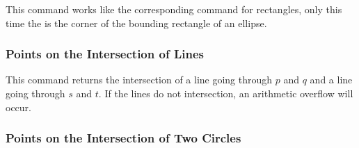 \begin{command}{\pgfpointborderellipse{}}
  This command works like the corresponding command for rectangles,
  only this time the  is the corner of the bounding
  rectangle of an ellipse.

\begin{codeexample}[]
\end{codeexample}
\end{command}


\subsubsection{Points on the Intersection of Lines}


\begin{command}{\pgfpointintersectionoflines{}}
  This command returns the intersection of a line going through $p$
  and $q$ and a line going through $s$ and $t$. If the lines do not
  intersection, an arithmetic overflow will occur.

\begin{codeexample}[]
\end{codeexample}
\end{command}


\subsubsection{Points on the Intersection of Two Circles}


